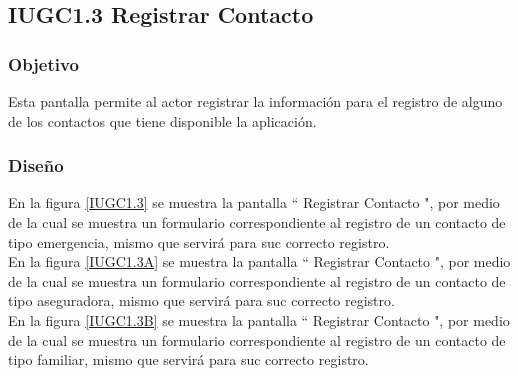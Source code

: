 \subsection{IUGC1.3 Registrar Contacto}

\subsubsection{Objetivo}

	
 Esta pantalla permite al actor registrar la información para el registro de alguno de los contactos que tiene disponible la aplicación.

\subsubsection{Diseño}


    En la figura \ref{IUGC1.3} se muestra la pantalla `` Registrar Contacto ", por medio de la cual se muestra un formulario correspondiente al registro de un contacto de tipo emergencia, mismo que servirá para suc correcto registro.\\

    En la figura \ref{IUGC1.3A} se muestra la pantalla `` Registrar Contacto ", por medio de la cual se muestra un formulario correspondiente al registro de un contacto de tipo aseguradora, mismo que servirá para suc correcto registro.\\

    En la figura \ref{IUGC1.3B} se muestra la pantalla `` Registrar Contacto ", por medio de la cual se muestra un formulario correspondiente al registro de un contacto de tipo familiar, mismo que servirá para suc correcto registro.\\
    

